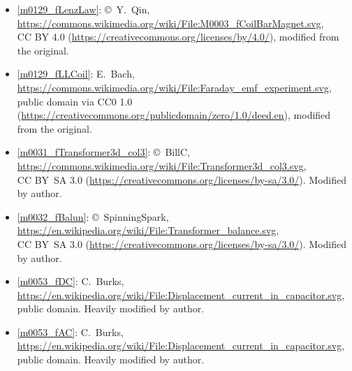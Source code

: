 \begin{itemize}

\item[Fig.] \label{m0129_fLenzLaw_credit}
  \ref{m0129_fLenzLaw}:
  \copyright~Y.\ Qin, 
  \url{https://commons.wikimedia.org/wiki/File:M0003_fCoilBarMagnet.svg},\\ 
  CC BY 4.0 (\url{https://creativecommons.org/licenses/by/4.0/}), 
  modified from the original.

\item[Fig.] \label{m0129_fLLCoil_Credit}
  \ref{m0129_fLLCoil}:
  E.\ Bach, 
  {\footnotesize \url{https://commons.wikimedia.org/wiki/File:Faraday_emf_experiment.svg}},\\ 
  public domain via CC0 1.0 (\url{https://creativecommons.org/publicdomain/zero/1.0/deed.en}), 
  modified from the original.

\item[Fig.] \label{m0031_fTransformer3d_col3_Credit}
  \ref{m0031_fTransformer3d_col3}:
  \copyright~BillC, 
  {\footnotesize \url{https://commons.wikimedia.org/wiki/File:Transformer3d_col3.svg}},\\ 
  CC BY~SA 3.0 (\url{https://creativecommons.org/licenses/by-sa/3.0/}).
  Modified by author.

\item[Fig.] \label{m0032_fBalun_Credit}
  \ref{m0032_fBalun}:
  \copyright~SpinningSpark, 
  {\footnotesize \url{https://en.wikipedia.org/wiki/File:Transformer_balance.svg}},\\ 
  CC BY~SA 3.0 (\url{https://creativecommons.org/licenses/by-sa/3.0/}).
  Modified by author.

\item[Fig.] \label{m0053_fDC_Credit}
  \ref{m0053_fDC}:
  C.\ Burks, 
  {\footnotesize \url{https://en.wikipedia.org/wiki/File:Displacement_current_in_capacitor.svg}},\\ 
  public domain.
  Heavily modified by author.

\item[Fig.] \label{m0053_fAC_Credit}
  \ref{m0053_fAC}:
  C.\ Burks, 
  {\footnotesize \url{https://en.wikipedia.org/wiki/File:Displacement_current_in_capacitor.svg}},\\ 
  public domain.
  Heavily modified by author.

\end{itemize}

\twocolumn
